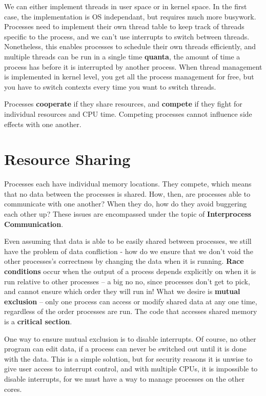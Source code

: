 We can either implement threads in user space or in kernel space. In the first case, the implementation is OS independant, but requires much more busywork. Processes need to implement their own thread table to keep track of threads specific to the process, and we can't use interrupts to switch between threads. Nonetheless, this enables processes to schedule their own threads efficiently, and multiple threads can be run in a single time {\bf quanta}, the amount of time a process has before it is interrupted by another process. When thread management is implemented in kernel level, you get all the process management for free, but you have to switch contexts every time you want to switch threads.

Processes {\bf cooperate} if they share resources, and {\bf compete} if they fight for individual resources and CPU time. Competing processes cannot influence side effects with one another.

\chapter{Resource Sharing}

Processes each have individual memory locations. They compete, which means that no data between the processes is shared. How, then, are processes able to communicate with one another? When they do, how do they avoid buggering each other up? These issues are encompassed under the topic of {\bf Interprocess Communication}.

Even assuming that data is able to be easily shared between processes, we still have the problem of data confliction - how do we ensure that we don't void the other processes's correctness by changing the data when it is running. {\bf Race conditions} occur when the output of a process depends explicitly on when it is run relative to other processes -- a big no no, since processes don't get to pick, and cannot ensure which order they will run in! What we desire is {\bf mutual exclusion} -- only one process can access or modify shared data at any one time, regardless of the order processes are run. The code that accesses shared memory is a {\bf critical section}.

One way to ensure mutual exclusion is to disable interrupts. Of course, no other program can edit data, if a process can never be switched out until it is done with the data. This is a simple solution, but for security reasons it is unwise to give user access to interrupt control, and with multiple CPUs, it is impossible to disable interrupts, for we must have a way to manage processes on the other cores.

